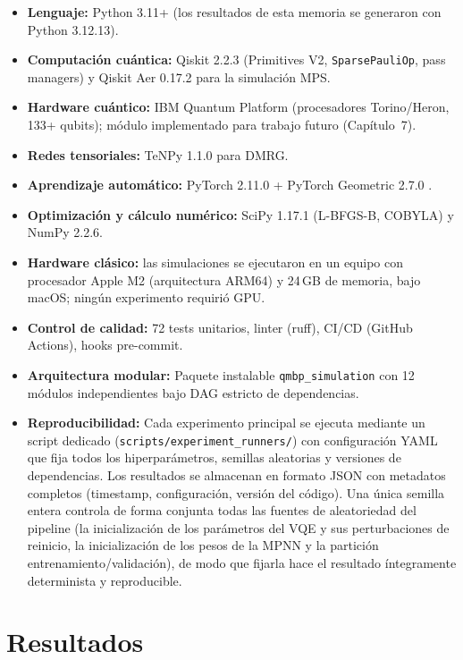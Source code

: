 \documentclass[11pt,a4paper,spanish]{book}
\begin{document}
\begin{itemize}
    \item \textbf{Lenguaje:} Python 3.11+ (los resultados de esta memoria se generaron con Python 3.12.13).
    \item \textbf{Computación cuántica:} Qiskit 2.2.3 (Primitives V2, \texttt{SparsePauliOp}, pass managers) y Qiskit Aer 0.17.2 para la simulación MPS.
    \item \textbf{Hardware cuántico:} IBM Quantum Platform (procesadores Torino/Heron, 133+ qubits); módulo implementado para trabajo futuro (Capítulo~7).
    \item \textbf{Redes tensoriales:} TeNPy 1.1.0 \citep{hauschild2018} para DMRG.
    \item \textbf{Aprendizaje automático:} PyTorch 2.11.0 + PyTorch Geometric 2.7.0 \citep{fey2019}.
    \item \textbf{Optimización y cálculo numérico:} SciPy 1.17.1 (L-BFGS-B, COBYLA) y NumPy 2.2.6.
    \item \textbf{Hardware clásico:} las simulaciones se ejecutaron en un equipo con procesador Apple M2 (arquitectura ARM64) y 24\,GB de memoria, bajo macOS; ningún experimento requirió GPU.
    \item \textbf{Control de calidad:} 72 tests unitarios, linter (ruff), CI/CD (GitHub Actions), hooks pre-commit.
    \item \textbf{Arquitectura modular:} Paquete instalable \texttt{qmbp\_simulation} con 12 módulos independientes bajo DAG estricto de dependencias.
    \item \textbf{Reproducibilidad:} Cada experimento principal se ejecuta mediante un script dedicado (\texttt{scripts/experiment\_runners/}) con configuración YAML que fija todos los hiperparámetros, semillas aleatorias y versiones de dependencias. Los resultados se almacenan en formato JSON con metadatos completos (timestamp, configuración, versión del código). Una única semilla entera controla de forma conjunta todas las fuentes de aleatoriedad del pipeline (la inicialización de los parámetros del VQE y sus perturbaciones de reinicio, la inicialización de los pesos de la MPNN y la partición entrenamiento/validación), de modo que fijarla hace el resultado íntegramente determinista y reproducible.
\end{itemize}



\chapter{Resultados}
\end{document}
